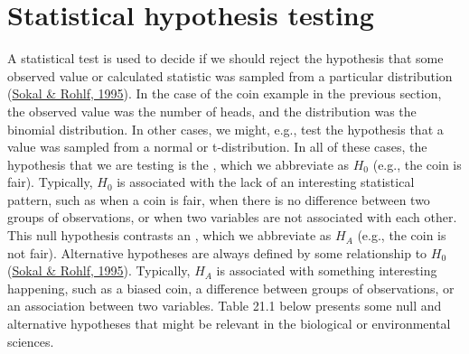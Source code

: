 \documentclass[
  openany]{krantz}
\begin{document}
\hypertarget{statistical-hypothesis-testing}{%
\section{Statistical hypothesis testing}\label{statistical-hypothesis-testing}}

A statistical test is used to decide if we should reject the hypothesis that some observed value or calculated statistic was sampled from a particular distribution (\protect\hyperlink{ref-Sokal1995}{Sokal \& Rohlf, 1995}).
In the case of the coin example in the previous section, the observed value was the number of heads, and the distribution was the binomial distribution.
In other cases, we might, e.g., test the hypothesis that a value was sampled from a normal or t-distribution.
In all of these cases, the hypothesis that we are testing is the \textbf{}, which we abbreviate as \(H_{0}\) (e.g., the coin is fair).
Typically, \(H_{0}\) is associated with the lack of an interesting statistical pattern, such as when a coin is fair, when there is no difference between two groups of observations, or when two variables are not associated with each other.
This null hypothesis contrasts an \textbf{}, which we abbreviate as \(H_{A}\) (e.g., the coin is not fair).
Alternative hypotheses are always defined by some relationship to \(H_{0}\) (\protect\hyperlink{ref-Sokal1995}{Sokal \& Rohlf, 1995}).
Typically, \(H_{A}\) is associated with something interesting happening, such as a biased coin, a difference between groups of observations, or an association between two variables.
Table 21.1 below presents some null and alternative hypotheses that might be relevant in the biological or environmental sciences.
\end{document}
